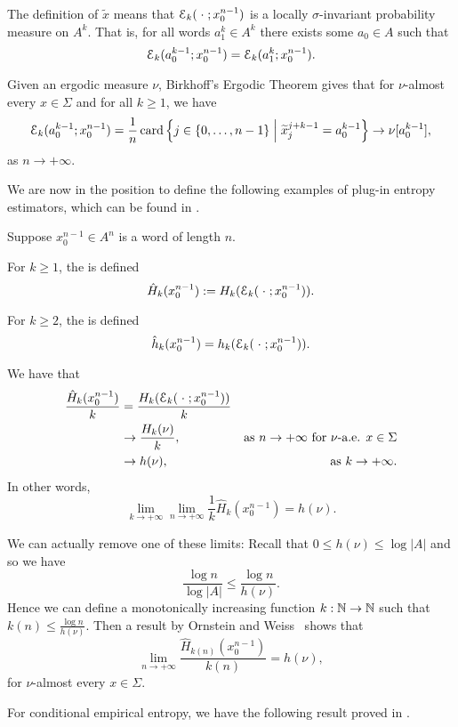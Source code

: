 The definition of $\tilde{x}$ means that $\mathcal{E}_k(\mathrel{}\cdot\mathrel{}; x_0^{n - 1})$ is a locally $\sigma$-invariant probability measure on $A^k$. That is, for all words $a_1^k \in A^k$ there exists some $a_0 \in A$ such that
\[
	\mathcal{E}_k(a_0^{k - 1}; x_0^{n - 1}) = \mathcal{E}_k(a_1^k; x_0^{n - 1}).
\]

Given an ergodic measure $\nu$, Birkhoff's Ergodic Theorem gives that for $\nu$-almost every $x \in \Sigma$ and for all $k \geq 1$, we have
\[
	\mathcal{E}_k(a_0^{k - 1}; x_0^{n - 1}) = \frac{1}{n}\operatorname{card}\left\{j \in \{0, \dots, n - 1\} \mathrel{}\middle|\mathrel{} \widetilde{x}_j^{j + k - 1} = a_0^{k - 1} \right\} \to \nu[a_0^{k - 1}],
\]
as $n \to +\infty$.

We are now in the position to define the following examples of plug-in entropy estimators, which can be found in \cite[Definition 2.1]{chazottes-gabrielle:large-deviations}.

\begin{definition}
	Suppose $x_0^{n - 1} \in A^n$ is a word of length $n$.
	
	For $k \geq 1$, the  is defined
	\[
		\hat{H}_k(x_0^{n - 1}) := H_k(\mathcal{E}_k(\mathrel{}\cdot\mathrel{}; x_0^{n - 1})).
	\]
	
	For $k \geq 2$, the  is defined
	\[
		\hat{h}_k(x_0^{n - 1}) = h_k(\mathcal{E}_k(\mathrel{}\cdot\mathrel{}; x_0^{n - 1})).
	\]
\end{definition}

We have that
\begin{align*}
	\frac{\hat{H}_k(x_0^{n - 1})}{k} &= \frac{H_k(\mathcal{E}_k(\mathrel{}\cdot\mathrel{}; x_0^{n - 1}))}{k} \\
		&\to \frac{H_k(\nu)}{k}, & \text{as } n \to +\infty \text{ for } \nu \text{-a.e. } x \in \Sigma  \\
		&\to h(\nu),	& \text{as } k \to +\infty.
\end{align*}
In other words,
\[
	\lim_{k \to +\infty} \lim_{n \to +\infty}{\frac{1}{k} \hat{H}_k(x_0^{n - 1})} = h(\nu).
\]

We can actually remove one of these limits: Recall that $0 \leq h(\nu) \leq \log{|A|}$ and so we have
\[
	\frac{\log{n}}{\log{|A|}} \leq \frac{\log{n}}{h(\nu)}.
\]
Hence we can define a monotonically increasing function $k : \mathbb{N} \to \mathbb{N}$ such that $k(n) \leq \frac{\log{n}}{h(\nu)}$. Then a result by Ornstein and Weiss~\cite{shields:ergodic} shows that
\[
	\lim_{n \to +\infty}{\frac{\hat{H}_{k(n)}(x_0^{n -1})}{k(n)}} = h(\nu),
\]
for $\nu$-almost every $x \in \Sigma$.

For conditional empirical entropy, we have the following result proved in \cite[Theorem II.3.5]{shields:ergodic}.

